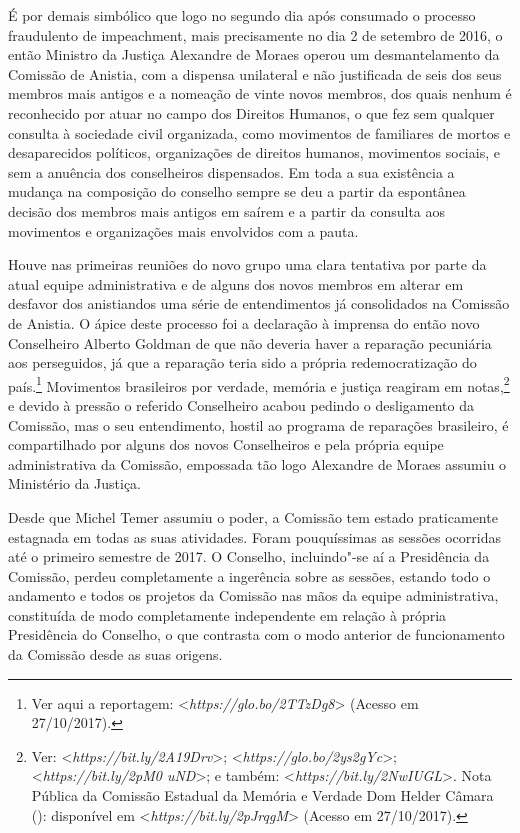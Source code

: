 É por demais simbólico que logo no segundo dia após consumado o processo
fraudulento de impeachment, mais precisamente no dia 2 de setembro de
2016, o então Ministro da Justiça Alexandre de Moraes operou um
desmantelamento da Comissão de Anistia, com a dispensa unilateral e não
justificada de seis dos seus membros mais antigos e a nomeação de vinte
novos membros, dos quais nenhum é reconhecido por atuar no campo dos
Direitos Humanos, o que fez sem qualquer consulta à sociedade civil
organizada, como movimentos de familiares de mortos e desaparecidos
políticos, organizações de direitos humanos, movimentos sociais, e sem a
anuência dos conselheiros dispensados. Em toda a sua existência a
mudança na composição do conselho sempre se deu a partir da espontânea
decisão dos membros mais antigos em saírem e a partir da consulta aos
movimentos e organizações mais envolvidos com a pauta.

Houve nas primeiras reuniões do novo grupo uma clara tentativa por parte
da atual equipe administrativa e de alguns dos novos membros em alterar
em desfavor dos anistiandos uma série de entendimentos já consolidados
na Comissão de Anistia. O ápice deste processo foi a declaração à
imprensa do então novo Conselheiro Alberto Goldman de que não deveria
haver a reparação pecuniária aos perseguidos, já que a reparação teria
sido a própria redemocratização do país.\footnote{Ver aqui a reportagem:
  \textless{}\emph{https://glo.bo/2TTzDg8}\textgreater{}
  (Acesso em 27/10/2017).} Movimentos brasileiros por verdade, memória
e justiça reagiram em notas,\footnote{Ver:
  \textless{}\emph{https://bit.ly/2A19Drv}\textgreater{};
  \textless{}\emph{https://glo.bo/2ys2gYc}\textgreater{};
  \textless{}\emph{https://bit.ly/2pM0 uND}\textgreater{};
  e também:
  \textless{}\emph{https://bit.ly/2NwIUGL}\textgreater{}.
  Nota Pública da Comissão Estadual da Memória e Verdade Dom Helder
  Câmara (): disponível em
  \textless{}\emph{https://bit.ly/2pJrqgM}\textgreater{}
  (Acesso em 27/10/2017).} e devido à pressão o referido Conselheiro
acabou pedindo o desligamento da Comissão, mas o seu entendimento,
hostil ao programa de reparações brasileiro, é compartilhado por alguns
dos novos Conselheiros e pela própria equipe administrativa da Comissão,
empossada tão logo Alexandre de Moraes assumiu o Ministério da Justiça.

Desde que Michel Temer assumiu o poder, a Comissão tem estado
praticamente estagnada em todas as suas atividades. Foram pouquíssimas
as sessões ocorridas até o primeiro semestre de 2017. O Conselho,
incluindo"-se aí a Presidência da Comissão, perdeu completamente a
ingerência sobre as sessões, estando todo o andamento e todos os
projetos da Comissão nas mãos da equipe administrativa, constituída de
modo completamente independente em relação à própria Presidência do
Conselho, o que contrasta com o modo anterior de funcionamento da
Comissão desde as suas origens.

